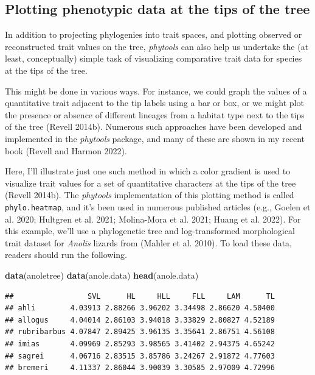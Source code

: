 \documentclass[fleqn,10pt,lineno]{wlpeerj} %
\newenvironment{Shaded}{\begin{snugshade}}{\end{snugshade}}
\newcommand{\FunctionTok}[1]{\textcolor[rgb]{0.13,0.29,0.53}{\textbf{#1}}}
\newcommand{\NormalTok}[1]{#1}
\begin{document}
\hypertarget{plotting-phenotypic-data-at-the-tips-of-the-tree}{%
\subsection{Plotting phenotypic data at the tips of the tree}\label{plotting-phenotypic-data-at-the-tips-of-the-tree}}

In addition to projecting phylogenies into trait spaces, and plotting observed or reconstructed trait values on the tree, \emph{phytools} can also help us undertake the (at least, conceptually) simple task of visualizing comparative trait data for species at the tips of the tree.

This might be done in various ways. For instance, we could graph the values of a quantitative trait adjacent to the tip labels using a bar or box, or we might plot the presence or absence of different lineages from a habitat type next to the tips of the tree (Revell 2014b). Numerous such approaches have been developed and implemented in the \emph{phytools} package, and many of these are shown in my recent book (Revell and Harmon 2022).

Here, I'll illustrate just one such method in which a color gradient is used to visualize trait values for a set of quantitative characters at the tips of the tree (Revell 2014b). The \emph{phytools} implementation of this plotting method is called \texttt{phylo.heatmap}, and it's been used in numerous published articles (e.g., Goelen et al. 2020; Hultgren et al. 2021; Molina-Mora et al. 2021; Huang et al. 2022). For this example, we'll use a phylogenetic tree and log-transformed morphological trait dataset for \emph{Anolis} lizards from (Mahler et al. 2010). To load these data, readers should run the following.

\begin{Shaded}
\begin{Highlighting}[]
\FunctionTok{data}\NormalTok{(anoletree)}
\FunctionTok{data}\NormalTok{(anole.data)}
\FunctionTok{head}\NormalTok{(anole.data)}
\end{Highlighting}
\end{Shaded}

\begin{verbatim}
##                 SVL      HL     HLL     FLL     LAM      TL
## ahli        4.03913 2.88266 3.96202 3.34498 2.86620 4.50400
## allogus     4.04014 2.86103 3.94018 3.33829 2.80827 4.52189
## rubribarbus 4.07847 2.89425 3.96135 3.35641 2.86751 4.56108
## imias       4.09969 2.85293 3.98565 3.41402 2.94375 4.65242
## sagrei      4.06716 2.83515 3.85786 3.24267 2.91872 4.77603
## bremeri     4.11337 2.86044 3.90039 3.30585 2.97009 4.72996
\end{verbatim}
\end{document}
